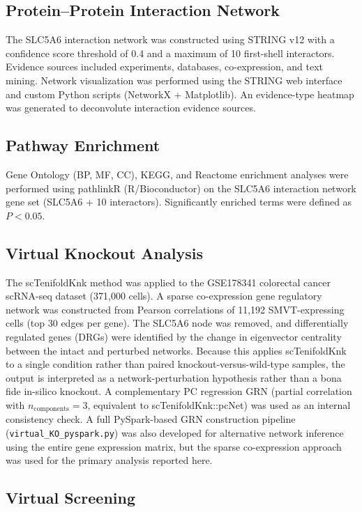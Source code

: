\documentclass[pdflatex,sn-nature]{sn-jnl}
\begin{document}
\subsection*{Protein--Protein Interaction Network}

The SLC5A6 interaction network was constructed using STRING v12 with a confidence score threshold of 0.4 and a maximum of 10 first-shell interactors. Evidence sources included experiments, databases, co-expression, and text mining. Network visualization was performed using the STRING web interface and custom Python scripts (NetworkX + Matplotlib). An evidence-type heatmap was generated to deconvolute interaction evidence sources.

\subsection*{Pathway Enrichment}

Gene Ontology (BP, MF, CC), KEGG, and Reactome enrichment analyses were performed using pathlinkR (R/Bioconductor) on the SLC5A6 interaction network gene set (SLC5A6 + 10 interactors). Significantly enriched terms were defined as $P < 0.05$.

\subsection*{Virtual Knockout Analysis}

The scTenifoldKnk method was applied to the GSE178341 colorectal cancer scRNA-seq dataset (371,000 cells). A sparse co-expression gene regulatory network was constructed from Pearson correlations of 11,192 SMVT-expressing cells (top 30 edges per gene). The SLC5A6 node was removed, and differentially regulated genes (DRGs) were identified by the change in eigenvector centrality between the intact and perturbed networks. Because this applies scTenifoldKnk to a single condition rather than paired knockout-versus-wild-type samples, the output is interpreted as a network-perturbation hypothesis rather than a bona fide in-silico knockout. A complementary PC regression GRN (partial correlation with $n_{\text{components}}=3$, equivalent to scTenifoldKnk::pcNet) was used as an internal consistency check. A full PySpark-based GRN construction pipeline (\texttt{virtual\_KO\_pyspark.py}) was also developed for alternative network inference using the entire gene expression matrix, but the sparse co-expression approach was used for the primary analysis reported here.

\subsection*{Virtual Screening}
\end{document}
